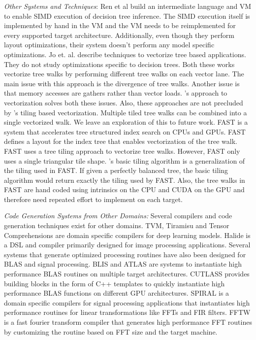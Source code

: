 \emph{Other Systems and Techniques}: 
Ren et al \cite{PortableVM} build an intermediate language and VM to 
enable SIMD execution of decision tree inference. The SIMD execution itself is implemented 
by hand in the VM and the VM needs to be reimplemented for every supported target architecture.
Additionally, even though they perform layout optimizations, their system doesn't perform 
any model specific optimizations. Jo et. al.\cite{MilindTreeVectorization} describe techniques 
to vectorize tree based applications. They do not study optimizations specific to decision trees.
Both these works vectorize tree walks by performing different tree walks on each vector lane.
The main issue with this approach is the divergence of tree walks. Another issue is that 
memory accesses are gathers rather than vector loads. \Treebeard{}'s approach to 
vectorization solves both these issues. Also, these approaches are not precluded 
by \Treebeard{}'s tiling based vectorization. Multiple tiled tree walks can be combined
into a single vectorized walk. We leave an exploration of this to future work. 
FAST\cite{FAST} is a system that accelerates tree structured index search 
on CPUs and GPUs. FAST defines a layout for the index tree that enables vectorization 
of the tree walk. FAST uses a tree tiling approach to vectorize tree walks. However, 
FAST only uses a single triangular tile shape. \Treebeard{}'s basic tiling algorithm 
is a generalization of the tiling used in FAST. If given a perfectly balanced tree,
the basic tiling algorithm would return exactly the tiling used by FAST. 
Also, the tree walks in FAST are hand coded using intrinsics on the CPU and CUDA 
on the GPU and therefore need repeated effort to implement on each target. 

\emph{Code Generation Systems from Other Domains:}
Several compilers and code generation techniques exist for other domains.
TVM\cite{TVM}, Tiramisu\cite{Tiramisu} and Tensor 
Comprehensions\cite{TensorComprehensions} are domain specific compilers 
for deep learning models. Halide\cite{Halide} is a DSL and compiler 
primarily designed for image processing applications. Several systems
that generate optimized processing routines have also been designed 
for BLAS and signal processing. BLIS\cite{BLIS} and ATLAS\cite{atlas_sc98}
are systems to instantiate high performance BLAS routines on multiple 
target architectures. CUTLASS\cite{CUTLASS} provides building blocks 
in the form of C++ templates to quickly instantiate high performance 
BLAS functions on different GPU architectures. SPIRAL\cite{SPIRAL}
is a domain specific compilers for signal processing applications
that instantiates high performance routines for linear transformations 
like FFTs and FIR filters. FFTW\cite{FFTW} is a fast fourier transform 
compiler that generates high performance FFT routines by customizing 
the routine based on FFT size and the target machine.
